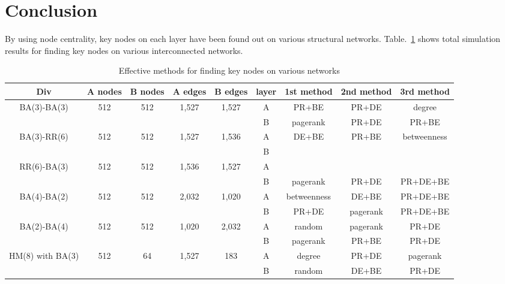 \section{Conclusion}
By using node centrality, key nodes on each layer have been found out on various structural networks. Table.~\ref{effective methods} shows total simulation results for finding key nodes on various interconnected networks. 
\begin{table}[!htb]
	\scriptsize
	\centering
	\caption{Effective methods for finding key nodes on various networks}
	\label{effective methods}
	\begin{center}
		\begin{tabular}{c|c|c|c|c|c|c|c|c} \hline\hline
		  Div                              & A nodes & B nodes & A edges & B edges & layer & 1st method & 2nd method  & 3rd method  \\ \hline \hline
         \multirow{1}{*}{BA(3)-BA(3)}      & 512 	 & 512     & 1,527   & 1,527   & A     & PR+BE      & PR+DE       & degree      \\ 
			                               &  	     &         &         &         & B     & pagerank   & PR+DE       & PR+BE       \\ \hline   
	     \multirow{1}{*}{BA(3)-RR(6)}      & 512     & 512     & 1,527   & 1,536   & A     & DE+BE      & PR+BE       & betweenness \\
	                                       &         &         &         &         & B     &            &             &             \\ \hline
	     \multirow{1}{*}{RR(6)-BA(3)}      & 512     & 512     & 1,536   & 1,527   & A     &            &             &             \\ 
	                                       &         &         &         &         & B     & pagerank   & PR+DE       & PR+DE+BE    \\ \hline
	   
		 \multirow{1}{*}{BA(4)-BA(2)}      & 512     & 512     & 2,032   & 1,020   & A     & betweenness& DE+BE       & PR+DE+BE    \\ 
		                                   &         &         &         &         & B     & PR+DE      & pagerank    & PR+DE+BE    \\ \hline
		 \multirow{1}{*}{BA(2)-BA(4)}      & 512     & 512     & 1,020   & 2,032   & A     & random     & pagerank    & PR+DE       \\ 
		                                   &         &         &         &         & B     & pagerank   & PR+BE       & PR+DE       \\ \hline
		 \multirow{1}{*}{HM(8) with BA(3)} & 512     & 64      & 1,527   & 183     & A     & degree     & PR+DE       & pagerank    \\ 
		                                   &         &         &         &         & B     & random     & DE+BE       & PR+DE       \\ \hline
			\hline
		\end{tabular}
	\end{center}
\end{table}
